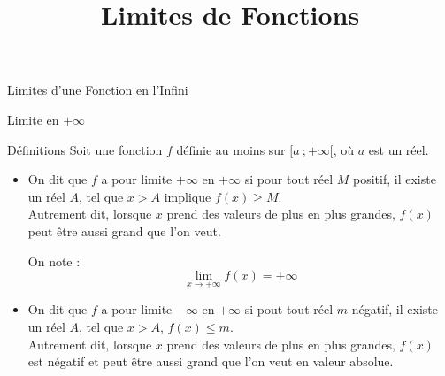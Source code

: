 \documentclass{cours}
\title{Limites de Fonctions}
\begin{document}

    \begin{Gpartie}{Limites d'une Fonction en l'Infini} 
        \begin{Spartie}{Limite en $+\infty$} 
            \begin{SSpartie}{Définitions} 
                Soit une fonction $f$ définie au moins sur $\big[a~;+\infty\big[$, où $a$ est un réel.

                \begin{itemize}
                    \item   On dit que $f$ a pour limite $+\infty$ en $+\infty$ si pour tout réel $M$ positif, il existe un réel $A$, tel que $x>A$ implique $f(x)\geq M$. \\ Autrement dit, lorsque $x$ prend des valeurs de plus en plus grandes, $f(x)$ peut être aussi grand que l'on veut.
                    
                    On note : \[\boxed{\lim\limits_{x\to +\infty}f(x)=+\infty}\] 
                    \begin{center}
                        \parbox{\linewidth}{}
                    \end{center}
                    \pagebreak
                    \vspace{2ex}
                    \item   On dit que $f$ a pour limite $-\infty$ en $+\infty$ si pout tout réel $m$ négatif, il existe un réel $A$, tel que $x>A$, $f(x)\leq m$. \\ Autrement dit, lorsque $x$ prend des valeurs de plus en plus grandes, $f(x)$ est négatif et peut être aussi grand que l'on veut en valeur absolue.
                    

\end{itemize}
\end{SSpartie}
\end{Spartie}
\end{Gpartie}
\end{document}
